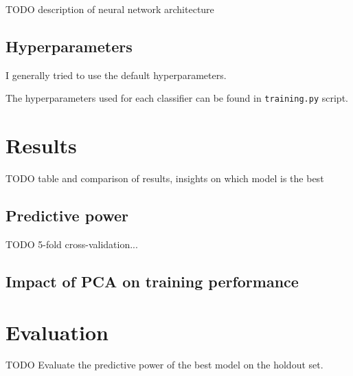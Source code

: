 \documentclass[10pt, twocolumn]{article}
\begin{document}
TODO description of neural network architecture


\subsection{Hyperparameters}
I generally tried to use the default hyperparameters. 

The hyperparameters used for each classifier can be found in \texttt{training.py} script.

\section{Results}
TODO table and comparison of results, insights on which model is the best
\subsection{Predictive power}
TODO 5-fold cross-validation... 

\subsection{Impact of PCA on training performance}

\section{Evaluation}
TODO Evaluate the predictive power of the best model on the holdout set.


\medskip
 


\end{document}
